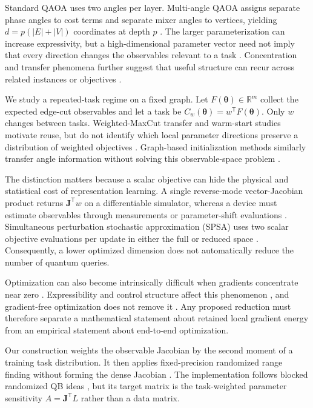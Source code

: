 \documentclass[aps,prx,reprint,superscriptaddress,floatfix]{revtex4-2}
\newcommand{\R}{\mathbb{R}}
\newcommand{\J}{\mathbf{J}}
\newcommand{\trans}{\mathsf{T}}
\begin{document}
Standard QAOA uses two angles per layer.  Multi-angle QAOA assigns separate
phase angles to cost terms and separate mixer angles to vertices, yielding
$d=p(|E|+|V|)$ coordinates at depth $p$ \citep{herrman2022multiangle}.  The larger parameterization can
increase expressivity, but a high-dimensional parameter vector need not imply
that every direction changes the observables relevant to a task
\citep{cerezo2021variational,zhou2020qaoa}.  Concentration and transfer
phenomena further suggest that useful structure can recur across related
instances or objectives \citep{brandao2018fixed,akshay2021concentration}.

We study a repeated-task regime on a fixed graph.  Let
$F(\bm\theta)\in\R^m$ collect the expected edge-cut observables and let a task
be $C_w(\bm\theta)=w^{\trans}F(\bm\theta)$.  Only $w$ changes between tasks.
Weighted-MaxCut transfer and warm-start studies motivate reuse, but do not
identify which local parameter directions preserve a distribution of weighted
objectives \citep{egger2021warm,shaydulin2023weighted}.  Graph-based
initialization methods similarly transfer angle information without solving
this observable-space problem \citep{jain2022gnn}.

The distinction matters because a scalar objective can hide the physical and
statistical cost of representation learning.  A single reverse-mode
vector-Jacobian product returns $\J^{\trans}w$ on a differentiable simulator,
whereas a device must estimate observables through measurements or
parameter-shift evaluations \citep{schuld2019evaluating,wierichs2022general}.
Simultaneous perturbation stochastic approximation (SPSA) uses two scalar
objective evaluations per update in either the full or reduced space
\citep{spall1992spsa}.  Consequently, a lower optimized dimension does not
automatically reduce the number of quantum queries.

Optimization can also become intrinsically difficult when gradients
concentrate near zero \citep{mcclean2018barren}.  Expressibility and control
structure affect this phenomenon \citep{holmes2022connecting,larocca2022diagnosing},
and gradient-free optimization does not remove it \citep{arrasmith2021effect}.
Any proposed reduction must therefore separate a mathematical statement about
retained local gradient energy from an empirical statement about end-to-end
optimization.

Our construction weights the observable Jacobian by the second moment of a
training task distribution.  It then applies fixed-precision randomized range
finding without forming the dense Jacobian \citep{halko2011finding,
martinsson2020randomized}.  The implementation follows blocked randomized QB
ideas \citep{yu2018randqb}, but its target matrix is the task-weighted
parameter sensitivity $A=\J^{\trans}L$ rather than a data matrix.
\end{document}
